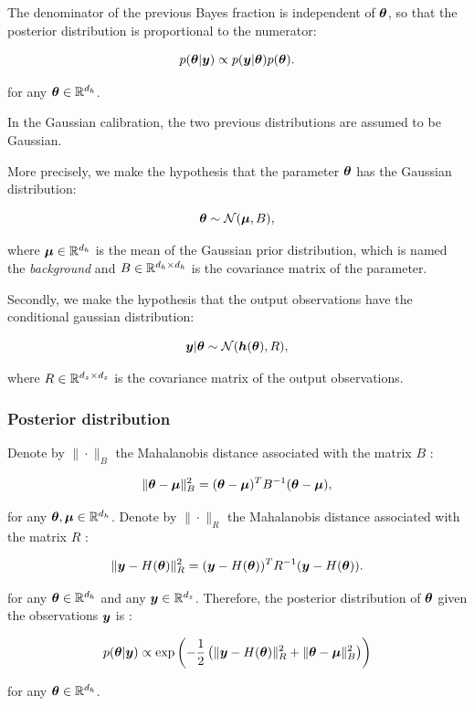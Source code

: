 \documentclass{beamer}
\begin{document}
\begin{frame}

The denominator of the previous Bayes fraction is independent of
$\boldsymbol{\theta}$, so that the posterior distribution is
proportional to the numerator:

$$
p(\boldsymbol{\theta} | \boldsymbol{y}) \propto  p(\boldsymbol{y} | \boldsymbol{\theta}) p(\boldsymbol{\theta}).
$$

for any $\boldsymbol{\theta}\in\mathbb{R}^{d_h}$.

In the Gaussian calibration, the two previous distributions are assumed
to be Gaussian.

More precisely, we make the hypothesis that the parameter
$\boldsymbol{\theta}$ has the Gaussian distribution:

$$
\boldsymbol{\theta} \sim \mathcal{N}(\boldsymbol{\mu}, B),
$$

where $\boldsymbol{\mu}\in\mathbb{R}^{d_h}$ is the mean of the Gaussian prior
distribution, which is named the \emph{background} and
$B\in\mathbb{R}^{d_h \times d_h}$ is the covariance matrix of the
parameter.

\end{frame}

\begin{frame}
Secondly, we make the hypothesis that the output observations have the
conditional gaussian distribution:

$$
\boldsymbol{y} | \boldsymbol{\theta} \sim \mathcal{N}(\boldsymbol{h}(\boldsymbol{\theta}), R),
$$

where $R\in\mathbb{R}^{d_z \times d_z}$ is the covariance matrix of the
output observations.
\end{frame}


\begin{frame}
\frametitle{Posterior distribution}

Denote by $\|\cdot\|_B$ the Mahalanobis distance associated with
the matrix $B$ :

$$
\|\boldsymbol{\theta}-\boldsymbol{\mu} \|^2_B = (\boldsymbol{\theta}-\boldsymbol{\mu} )^T B^{-1} (\boldsymbol{\theta}-\boldsymbol{\mu} ),
$$

for any $\boldsymbol{\theta},\boldsymbol{\mu} \in \mathbb{R}^{d_h}$. Denote by
$\|\cdot\|_R$ the Mahalanobis distance associated with the matrix
$R$ :

$$
\|\boldsymbol{y}-H(\boldsymbol{\theta})\|^2_R = (\boldsymbol{y}-H(\boldsymbol{\theta}))^T R^{-1} (\boldsymbol{y}-H(\boldsymbol{\theta})).
$$

for any $\boldsymbol{\theta} \in \mathbb{R}^{d_h}$ and any
$\boldsymbol{y} \in \mathbb{R}^{d_z}$. Therefore, the posterior distribution
of $\boldsymbol{\theta}$ given the observations $\boldsymbol{y}$ is :

$$
   p(\boldsymbol{\theta}|\boldsymbol{y}) \propto \exp\left( -\frac{1}{2} \left( \|\boldsymbol{y}-H(\boldsymbol{\theta})\|^2_R 
   + \|\boldsymbol{\theta}-\boldsymbol{\mu} \|^2_B \right) \right)
$$

for any $\boldsymbol{\theta}\in\mathbb{R}^{d_h}$.
\end{frame}
\end{document}
